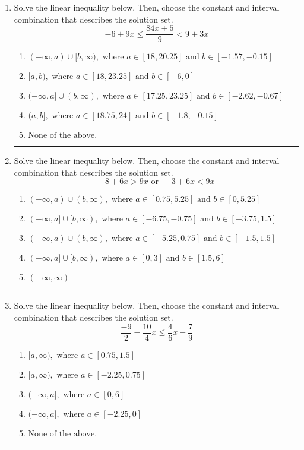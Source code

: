 \documentclass[14pt]{extbook}
\newcommand{\litem}[1]{\item#1\hspace*{-1cm}\rule{\textwidth}{0.4pt}}
\begin{document}
\begin{enumerate}
{\begin{enumerate}[label=\Alph*.]
\end{enumerate} }
\litem{
Solve the linear inequality below. Then, choose the constant and interval combination that describes the solution set.\[ -6 + 9 x \leq \frac{84 x + 5}{9} < 9 + 3 x \]\begin{enumerate}[label=\Alph*.]
\item \( (-\infty, a) \cup [b, \infty), \text{ where } a \in [18, 20.25] \text{ and } b \in [-1.57, -0.15] \)
\item \( [a, b), \text{ where } a \in [18, 23.25] \text{ and } b \in [-6, 0] \)
\item \( (-\infty, a] \cup (b, \infty), \text{ where } a \in [17.25, 23.25] \text{ and } b \in [-2.62, -0.67] \)
\item \( (a, b], \text{ where } a \in [18.75, 24] \text{ and } b \in [-1.8, -0.15] \)
\item \( \text{None of the above.} \)

\end{enumerate} }
\litem{
Solve the linear inequality below. Then, choose the constant and interval combination that describes the solution set.\[ -8 + 6 x > 9 x \text{ or } -3 + 6 x < 9 x \]\begin{enumerate}[label=\Alph*.]
\item \( (-\infty, a) \cup (b, \infty), \text{ where } a \in [0.75, 5.25] \text{ and } b \in [0, 5.25] \)
\item \( (-\infty, a] \cup [b, \infty), \text{ where } a \in [-6.75, -0.75] \text{ and } b \in [-3.75, 1.5] \)
\item \( (-\infty, a) \cup (b, \infty), \text{ where } a \in [-5.25, 0.75] \text{ and } b \in [-1.5, 1.5] \)
\item \( (-\infty, a] \cup [b, \infty), \text{ where } a \in [0, 3] \text{ and } b \in [1.5, 6] \)
\item \( (-\infty, \infty) \)

\end{enumerate} }
\litem{
Solve the linear inequality below. Then, choose the constant and interval combination that describes the solution set.\[ \frac{-9}{2} - \frac{10}{4} x \leq \frac{4}{6} x - \frac{7}{9} \]\begin{enumerate}[label=\Alph*.]
\item \( [a, \infty), \text{ where } a \in [0.75, 1.5] \)
\item \( [a, \infty), \text{ where } a \in [-2.25, 0.75] \)
\item \( (-\infty, a], \text{ where } a \in [0, 6] \)
\item \( (-\infty, a], \text{ where } a \in [-2.25, 0] \)
\item \( \text{None of the above}. \)


\end{enumerate}}
\end{enumerate}
\end{document}
